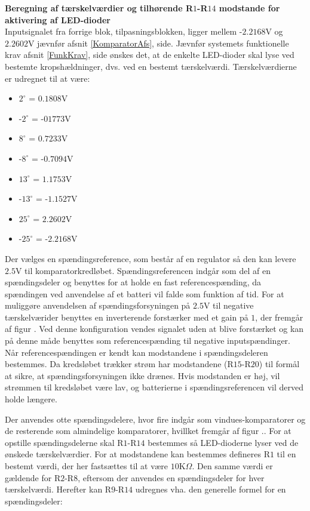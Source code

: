 \noindent\textbf{Beregning af tærskelværdier og tilhørende R$1$-R$14$ modstande for aktivering af LED-dioder} \\
Inputsignalet fra forrige blok, tilpasningsblokken, ligger mellem -$2.2168$V og $2.2602$V jævnfør afsnit \ref{KomparatorAfs}, side\pageref{KomparatorAfs}. Jævnfør systemets funktionelle krav afsnit \ref{FunkKrav}, side \pageref{FunkKrav} ønskes det, at de enkelte LED-dioder skal lyse ved bestemte kropshældninger, dvs. ved en bestemt tærskelværdi. %
Tærskelværdierne er udregnet til at være:
\begin{itemize}
\item $2^{\circ}$ = $0.1808$V
\item -$2^{\circ}$ = -$01773$V
\item $8^{\circ}$ = $0.7233$V
\item -$8^{\circ}$ = -$0.7094$V
\item $13^{\circ}$ = $1.1753$V
\item -$13^{\circ}$ = -$1.1527$V
\item $25^{\circ}$ = $2.2602$V
\item -$25^{\circ}$ = -$2.2168$V
\end{itemize}

Der vælges en  spændingsreference, som består af en regulator så den kan levere $2.5$V til komparatorkredløbet. Spændingsreferencen indgår som del af en spændingsdeler og benyttes for at holde en fast referencespænding, da spændingen ved anvendelse af et batteri vil falde som funktion af tid. For at muliggøre anvendelsen af spændingsforsyningen på $2.5$V til negative tærskelværider benyttes en inverterende forstærker med et gain på $1$, der fremgår af figur . Ved denne konfiguration vendes signalet uden at blive forstærket og kan på denne måde benyttes som referencespænding til negative inputspændinger.  
Når referencespændingen er kendt kan modstandene i spændingsdeleren bestemmes. Da kredsløbet trækker strøm har modstandene (R$15$-R$20$) til formål at sikre, at spændingsforsyningen ikke drænes. Hvis modstanden er høj, vil strømmen til kredsløbet være lav, og batterierne i spændingsreferencen vil derved holde længere.

Der anvendes otte spændingsdelere, hvor fire indgår som vindues-komparatorer og de resterende som almindelige komparatorer, hvillket fremgår af figur .. 
For at opstille spændingsdelerne skal R$1$-R$14$ bestemmes så LED-dioderne lyser ved de ønskede tærskelværdier. For at modstandene kan bestemmes defineres R$1$ til en bestemt værdi, der her fastsættes til at være $10$K$\Omega$. Den samme værdi er gældende for R$2$-R$8$, eftersom der anvendes en spændingsdeler for hver tærskelværdi. Herefter kan R$9$-R$14$ udregnes vha. den generelle formel for en spændingsdeler:

